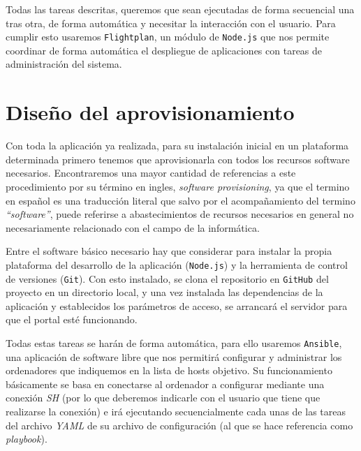 \bigskip
Todas las tareas descritas, queremos que sean ejecutadas de forma secuencial una tras otra, de forma automática y necesitar la interacción con el usuario. Para cumplir esto usaremos {\tt Flightplan}, un módulo de {\tt Node.js} que nos permite coordinar de forma automática el despliegue de aplicaciones con tareas de administración del sistema.

\newpage
\section{Diseño del aprovisionamiento}

Con toda la aplicación ya realizada, para su instalación inicial en un plataforma determinada primero tenemos que aprovisionarla con todos los recursos software necesarios. Encontraremos una mayor cantidad de referencias a este procedimiento por su término en ingles, \textit{software provisioning}, ya que el termino en español es una traducción literal que salvo por el acompañamiento del termino \textit{``software''}, puede referirse a abastecimientos de recursos necesarios en general no necesariamente relacionado con el campo de la informática.

\bigskip
Entre el software básico necesario hay que considerar para instalar la propia plataforma del desarrollo de la aplicación ({\tt Node.js}) y la herramienta de control de versiones ({\tt Git}). Con esto instalado, se clona el repositorio en {\tt GitHub} del proyecto en un directorio local, y una vez instalada las dependencias de la aplicación y establecidos los parámetros de acceso, se arrancará el servidor para que el portal esté funcionando.

\bigskip
Todas estas tareas se harán de forma automática, para ello usaremos {\tt Ansible}, una aplicación de software libre que nos permitirá configurar y administrar los ordenadores que indiquemos en la lista de hosts objetivo. Su funcionamiento básicamente se basa en conectarse al ordenador a configurar mediante una conexión \textit{SH} (por lo que deberemos indicarle con el usuario que tiene que realizarse la conexión) e irá ejecutando secuencialmente cada unas de las tareas del archivo \textit{YAML} de su archivo de configuración (al que se hace referencia como \textit{playbook}).
